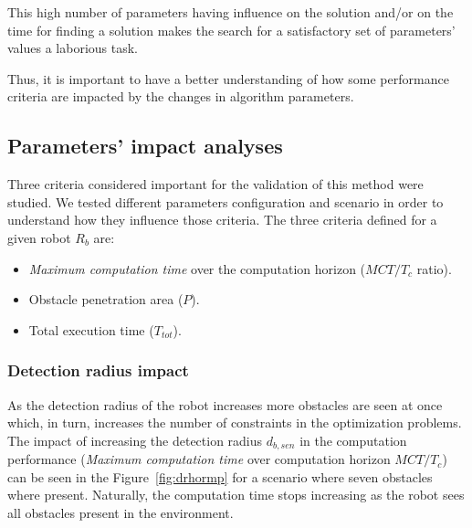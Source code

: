 \documentclass[eprint]{actapoly}
\begin{document}
This high number of parameters having influence on the solution
and/or on the time for finding a solution makes the search for a
satisfactory set of parameters' values a laborious task.

Thus, it is important to have a better understanding of how some
performance criteria are impacted by the changes in algorithm
parameters.

\subsection{Parameters' impact analyses}

Three criteria considered important for the validation of this method were 
studied.
We tested different parameters configuration and scenario in order to 
understand how they influence
those criteria.
The three criteria defined for a given robot $R_b$ are:

\begin{itemize}

\item
\textit{Maximum computation time} over the computation horizon ($MCT/T_c$ 
ratio).

\item
Obstacle penetration area ($P$).

\item
Total execution time ($T_{tot}$).

\end{itemize}

\subsubsection{Detection radius impact}

As the detection radius of the robot increases more obstacles are
seen at once which, in turn,
increases the number of constraints in the optimization problems.
The impact of increasing the detection radius $d_{b,sen}$ in the computation
performance (\textit{Maximum computation time} over computation horizon $MCT/T_c$) can
be seen in the Figure~\ref{fig:drhormp} for a scenario where seven obstacles where present.
Naturally, the computation time stops increasing as the robot sees all obstacles present
in the environment.
\end{document}
